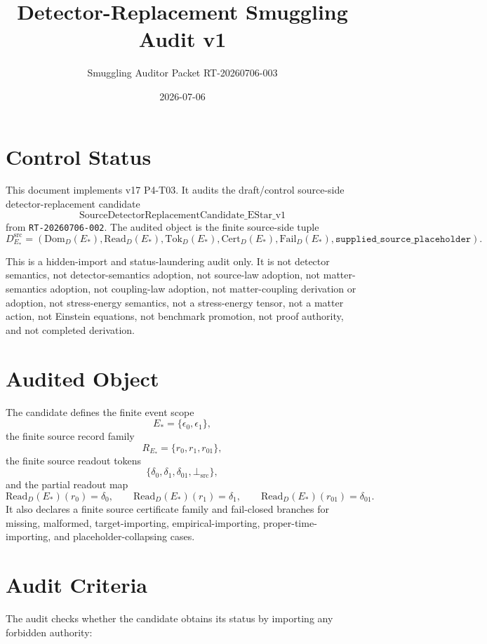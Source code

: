 \documentclass[11pt]{article}
\title{Detector-Replacement Smuggling Audit v1}
\author{Smuggling Auditor Packet RT-20260706-003}
\date{2026-07-06}
\newcommand{\EStar}{E_{\ast}}
\newcommand{\RStar}{R_{E_{\ast}}}
\newcommand{\DSrc}{D^{\mathrm{src}}_{E_{\ast}}}
\newcommand{\ReadD}{\mathrm{Read}_{D}(E_{\ast})}
\newcommand{\CertD}{\mathrm{Cert}_{D}(E_{\ast})}
\newcommand{\FailD}{\mathrm{Fail}_{D}(E_{\ast})}
\newcommand{\BottomSrc}{\bot_{\mathrm{src}}}
\begin{document}
\maketitle

\section{Control Status}

This document implements v17 P4-T03. It audits the draft/control
source-side detector-replacement candidate
\[
  \mathrm{SourceDetectorReplacementCandidate\_EStar\_v1}
\]
from \texttt{RT-20260706-002}. The audited object is the finite source-side
tuple
\[
  \DSrc=(\mathrm{Dom}_{D}(\EStar),\ReadD,\mathrm{Tok}_{D}(\EStar),
  \CertD,\FailD,\texttt{supplied\_source\_placeholder}).
\]

This is a hidden-import and status-laundering audit only. It is not detector
semantics, not detector-semantics adoption, not source-law adoption, not
matter-semantics adoption, not coupling-law adoption, not matter-coupling
derivation or adoption, not stress-energy semantics, not a stress-energy
tensor, not a matter action, not Einstein equations, not benchmark promotion,
not proof authority, and not completed derivation.

\section{Audited Object}

The candidate defines the finite event scope
\[
  \EStar=\{\epsilon_0,\epsilon_1\},
\]
the finite source record family
\[
  \RStar=\{r_0,r_1,r_{01}\},
\]
the finite source readout tokens
\[
  \{\delta_0,\delta_1,\delta_{01},\BottomSrc\},
\]
and the partial readout map
\[
  \ReadD(r_0)=\delta_0,\qquad
  \ReadD(r_1)=\delta_1,\qquad
  \ReadD(r_{01})=\delta_{01}.
\]
It also declares a finite source certificate family and fail-closed branches
for missing, malformed, target-importing, empirical-importing,
proper-time-importing, and placeholder-collapsing cases.

\section{Audit Criteria}

The audit checks whether the candidate obtains its status by importing any
forbidden authority:
\end{document}
